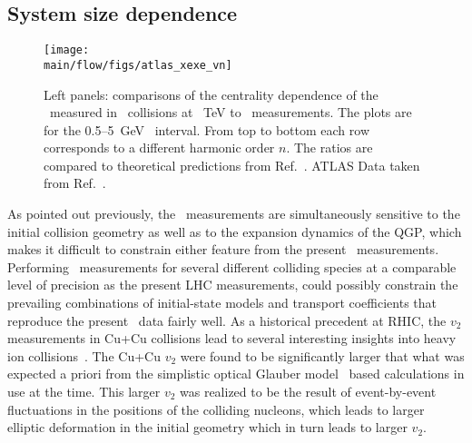 \subsection{System size dependence}
\label{sec:flow_sizedep}

\begin{figure}[!ht]
\begin{center}
\texttt{[image: \\main/flow/figs/atlas\_xexe\_vn]}
\caption{
Left panels: comparisons of the centrality dependence of the \vn\ measured 
  in \pbpb\ collisions at ~TeV to \xexe\ measurements. 
The plots are for the 0.5--5~GeV \pT\ interval. 
From top to bottom each row corresponds to a different harmonic order $n$.
The ratios are compared to theoretical predictions from Ref.~\cite{Giacalone:2017dud}.
ATLAS Data taken from Ref.~\cite{ATLAS-CONF-2018-011}.
}
\label{fig:atlas_xexe_vn}
\end{center}
\end{figure}

As pointed out previously, the \vn\ measurements are simultaneously
  sensitive to the initial collision geometry as well as to the 
  expansion dynamics of the QGP, which makes it difficult to 
  constrain either feature from the present \vn\ measurements.
Performing \vn\ measurements for several different colliding species
  at a comparable level of precision as the present LHC measurements,  
  could possibly constrain the prevailing combinations of initial-state 
  models and transport coefficients that reproduce the present \vn\ data 
  fairly well.
As a historical precedent at RHIC, the $v_2$ measurements in Cu+Cu 
  collisions lead to several interesting insights into heavy ion 
  collisions~\cite{RHIC_CU_CU}.
The Cu+Cu $v_2$ were found to be significantly larger that what was 
  expected a priori from the simplistic optical Glauber model~\cite{OPTICAL_GLAUBER}
  based calculations in use at the time.
This larger $v_2$ was realized to be the result of event-by-event fluctuations
  in the positions of the colliding nucleons, which leads to larger
  elliptic deformation in the initial geometry which in turn leads 
  to larger $v_2$.


